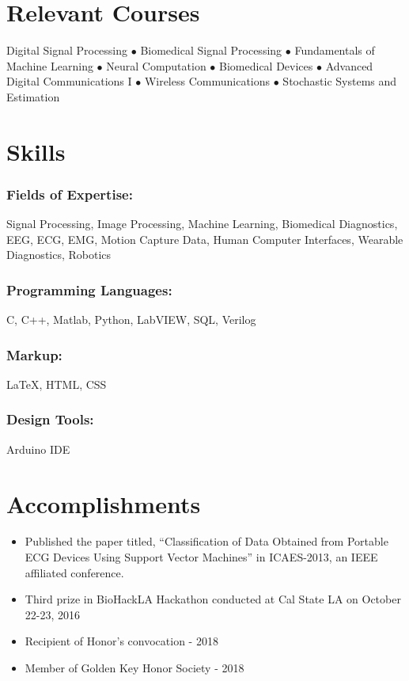 \documentclass{article}
\begin{document}
\section{Relevant Courses}
Digital Signal Processing $\bullet$ Biomedical Signal Processing $\bullet$ Fundamentals of Machine Learning $\bullet$ Neural Computation $\bullet$ Biomedical Devices $\bullet$ Advanced Digital Communications I $\bullet$ Wireless Communications $\bullet$ Stochastic Systems and Estimation


\section{Skills}
\subsubsection{Fields of Expertise:} 
Signal Processing, Image Processing, Machine Learning, Biomedical Diagnostics, EEG, ECG, EMG, Motion Capture Data, Human Computer Interfaces, Wearable Diagnostics, Robotics
\subsubsection{Programming Languages:} 
C, C++, Matlab, Python, LabVIEW, SQL, Verilog
\subsubsection{Markup:} 
{\LaTeX}, HTML, CSS
\subsubsection{Design Tools:} 
Arduino IDE


\section{Accomplishments}
\begin{itemize}
    \item Published the paper titled, “Classification of Data Obtained from Portable ECG Devices Using Support Vector Machines” in ICAES-2013, an IEEE affiliated conference.
    \item Third prize in BioHackLA Hackathon conducted at Cal State LA on October 22-23, 2016
    \item Recipient of Honor's convocation - 2018
    \item Member of Golden Key Honor Society - 2018
\end{itemize}
\end{document}
